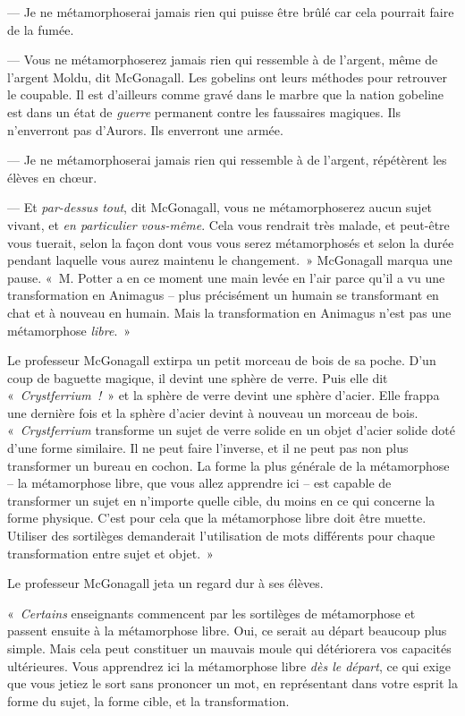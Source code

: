 --- Je ne métamorphoserai jamais rien qui puisse être brûlé car cela pourrait faire de la fumée.

--- Vous ne métamorphoserez jamais rien qui ressemble à de l'argent, même de l'argent Moldu, dit McGonagall.
Les gobelins ont leurs méthodes pour retrouver le coupable.
Il est d'ailleurs comme gravé dans le marbre que la nation gobeline est dans un état de \emph{guerre} permanent contre les faussaires magiques.
Ils n'enverront pas d'Aurors.
Ils enverront une armée.

--- Je ne métamorphoserai jamais rien qui ressemble à de l'argent, répétèrent les élèves en chœur.

--- Et \emph{par-dessus tout}, dit McGonagall, vous ne métamorphoserez aucun sujet vivant, et \emph{en particulier vous-même}.
Cela vous rendrait très malade, et peut-être vous tuerait, selon la façon dont vous vous serez métamorphosés et selon la durée pendant laquelle vous aurez maintenu le changement.~»
McGonagall marqua une pause. «~M. Potter a en ce moment une main levée en l'air parce qu'il a vu une transformation en Animagus -- plus précisément un humain se transformant en chat et à nouveau en humain.
Mais la transformation en Animagus n'est pas une métamorphose \emph{libre}.~»

Le professeur McGonagall extirpa un petit morceau de bois de sa poche. D'un coup de baguette magique, il devint une sphère de verre. Puis elle dit «~\emph{Crystferrium~!}~» et la sphère de verre devint une sphère d'acier. Elle frappa une dernière fois et la sphère d'acier devint à nouveau un morceau de bois. «~\emph{Crystferrium} transforme un sujet de verre solide en un objet d'acier solide doté d'une forme similaire. Il ne peut faire l'inverse, et il ne peut pas non plus transformer un bureau en cochon. La forme la plus générale de la métamorphose -- la métamorphose libre, que vous allez apprendre ici -- est capable de transformer un sujet en n'importe quelle cible, du moins en ce qui concerne la forme physique. C'est pour cela que la métamorphose libre doit être muette. Utiliser des sortilèges demanderait l'utilisation de mots différents pour chaque transformation entre sujet et objet.~»

Le professeur McGonagall jeta un regard dur à ses élèves.

«~\emph{Certains} enseignants commencent par les sortilèges de métamorphose et passent ensuite à la métamorphose libre. Oui, ce serait au départ beaucoup plus simple. Mais cela peut constituer un mauvais moule qui détériorera vos capacités ultérieures. Vous apprendrez ici la métamorphose libre \emph{dès le départ}, ce qui exige que vous jetiez le sort sans prononcer un mot, en représentant dans votre esprit la forme du sujet, la forme cible, et la transformation. %

